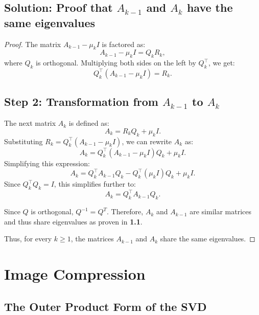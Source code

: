 \documentclass[12pt]{article}
\begin{document}
\subsection{Solution: Proof that \( A_{k-1} \) and \( A_k \) have the same eigenvalues}
\begin{proof}
The matrix \( A_{k-1} - \mu_k I \) is factored as:
\[
A_{k-1} - \mu_k I = Q_k R_k,
\]
where \( Q_k \) is orthogonal. Multiplying both sides on the left by \( Q_k^\top \), we get:
\[
Q_k^\top (A_{k-1} - \mu_k I) = R_k.
\]

\subsection*{Step 2: Transformation from \( A_{k-1} \) to \( A_k \)}  
The next matrix \( A_k \) is defined as:
\[
A_k = R_k Q_k + \mu_k I.
\]
Substituting \( R_k = Q_k^\top (A_{k-1} - \mu_k I) \), we can rewrite \( A_k \) as:
\[
A_k = Q_k^\top (A_{k-1} - \mu_k I) Q_k + \mu_k I.
\]
Simplifying this expression:
\[
A_k = Q_k^\top A_{k-1} Q_k - Q_k^\top (\mu_k I) Q_k + \mu_k I.
\]
Since \( Q_k^\top Q_k = I \), this simplifies further to:
\[
A_k = Q_k^\top A_{k-1} Q_k.
\]

Since $Q$ is orthogonal, $Q^{-1} = Q^T$. Therefore, $A_k $ and $A_{k-1}$ are similar matrices and thus share eigenvalues as proven in \textbf{1.1}.

Thus, for every \( k \geq 1 \), the matrices \( A_{k-1} \) and \( A_k \) share the same eigenvalues.
\end{proof}

\section{Image Compression}
\subsection{The Outer Product Form of the SVD}
\end{document}
